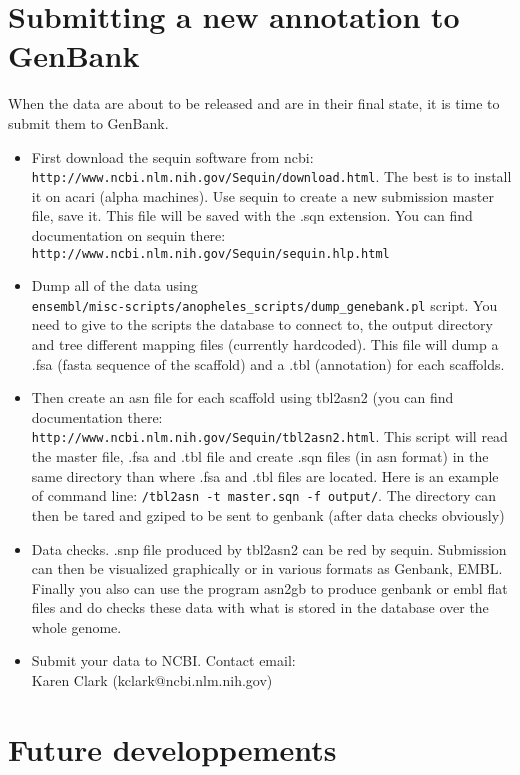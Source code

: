 \documentclass[a4paper,10pt]{article}
\begin{document}
\section{Submitting a new annotation to GenBank}
When the data are about to be released and are in their final state, it is time to submit them to GenBank.
\begin{itemize}
\item{First download the sequin software from ncbi:\\ 
\texttt{http://www.ncbi.nlm.nih.gov/Sequin/download.html}. The best is to install it on acari (alpha machines). Use sequin to create a new submission master file, save it. This file will be saved with the .sqn extension. You can find documentation on sequin there: \\
\texttt{http://www.ncbi.nlm.nih.gov/Sequin/sequin.hlp.html}}
\item{Dump all of the data using\\ 
\texttt{ensembl/misc-scripts/anopheles\_scripts/dump\_genebank.pl} script. You need to give to the scripts the database to connect to, the output directory and tree different mapping files (currently hardcoded). This file will dump a .fsa (fasta sequence of the scaffold) and a .tbl (annotation) for each scaffolds.}
\item{Then create an asn file for each scaffold using tbl2asn2 (you can find documentation there:\\ 
\texttt{http://www.ncbi.nlm.nih.gov/Sequin/tbl2asn2.html}. This script will read the master file, .fsa and .tbl file and create .sqn files (in asn format) in the same directory than where .fsa and .tbl files are located. Here is an example of command line: \texttt{/tbl2asn -t master.sqn -f output/}. The directory can then be tared and gziped to be sent to genbank (after data checks obviously)}
\item{Data checks. .snp file produced by tbl2asn2 can be red by sequin. Submission can then be visualized graphically or in various formats as Genbank, EMBL. Finally you also can use the program asn2gb to produce genbank or embl flat files and do checks these data with what is stored in the database over the whole genome.}
\item{Submit your data to NCBI. Contact email:\\ Karen Clark (kclark@ncbi.nlm.nih.gov)}
\end{itemize}

\section{Future developpements}
\end{document}
